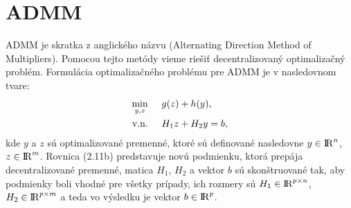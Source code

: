 \section{ADMM}
\label{subse:ADMM}
ADMM je skratka z anglického názvu (Alternating Direction Method of Multipliers). Pomocou tejto metódy vieme riešiť decentralizovaný optimalizačný problém.
Formulácia optimalizačného problému pre ADMM je v nasledovnom tvare:
\begin{subequations}
	\begin{align}
		\displaystyle \min_{y,z} \hspace{0.5cm} & 
		g(z) + h(y),\\
		\textrm{v.n.} \hspace{0.5cm} & H_{1}z + H_{2}y = b,
	\end{align}
\end{subequations}
kde $y$ a $z$ sú optimalizované premenné, ktoré sú definované nasledovne $y \in {\rm I\!R}^n $, $ z\in {\rm I\!R}^m$. Rovnica (2.11b) predstavuje novú podmienku, ktorá prepája decentralizované premenné, matica $H_{1}$, $H_{2}$ a vektor $b$ sú skonštruované tak, aby podmienky boli vhodné pre všetky prípady, ich rozmery sú $H_{1} \in {\rm I\!R}^{p \times n}$, $H_{2} \in {\rm I\!R}^{p \times m}$ a teda vo výsledku je vektor $b \in {\rm I\!R}^p $. 

